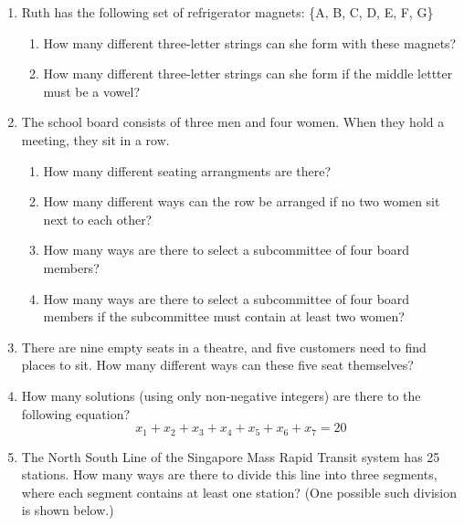 \documentclass{article}
\begin{document}
\begin{enumerate}
\item Ruth has the following set of refrigerator magnets: \{A, B, C, D, E, F, G\}\marginpar{[3]}
	\begin{enumerate}
	\item How many different three-letter strings can she form with these magnets?
	\item How many different three-letter strings can she form if the middle lettter must be a vowel?
	\end{enumerate}
\item The school board consists of three men and four women. When they hold a meeting, they sit in a row.\marginpar{[7]}
	\begin{enumerate}
	\item How many different seating arrangments are there?
	\item How many different ways can the row be arranged if no two women sit next to each other?
	\item How many ways are there to select a subcommittee of four board members?
	\item How many ways are there to select a subcommittee of four board members if the subcommittee must contain at least two women?
	\end{enumerate}
\item There are nine empty seats in a theatre, and five customers need to find places to sit. How many different ways can these five seat themselves?\marginpar{[2]}
\item How many solutions (using only non-negative integers) are there to the following equation?\marginpar{[2]}
	\begin{equation*}
	x_1+x_2+x_3+x_4+x_5+x_6+x_7=20
	\end{equation*}
\item The North South Line of the Singapore Mass Rapid Transit system has 25 stations. How many ways are there to divide this line into three segments, where each segment contains at least one station? (One possible such division is shown below.)\marginpar{[2]}\\[1em]
\end{enumerate}
\end{document}
